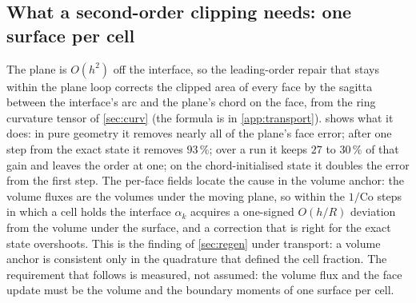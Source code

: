 \documentclass[preprint,12pt]{elsarticle}
\begin{document}
\subsection{What a second-order clipping needs: one surface per cell}
\label{sec:tpf-sagitta}

The plane is $O(h^2)$ off the interface, so the leading-order repair that stays within the plane loop corrects the clipped area of every face by the sagitta between the interface's arc and the plane's chord on the face, from the ring curvature tensor of \cref{sec:curv} (the formula is in \ref{app:transport}).  shows what it does: in pure geometry it removes nearly all of the plane's face error; after one step from the exact state it removes $93\,\%$; over a run it keeps $27$ to $30\,\%$ of that gain and leaves the order at one; on the chord-initialised state it doubles the error from the first step. The per-face fields locate the cause in the volume anchor: the volume fluxes are the volumes under the moving plane, so within the $1/\mathrm{Co}$ steps in which a cell holds the interface $\alpha_k$ acquires a one-signed $O(h/R)$ deviation from the volume under the surface, and a correction that is right for the exact state overshoots. This is the finding of \cref{sec:regen} under transport: a volume anchor is consistent only in the quadrature that defined the cell fraction. The requirement that follows is measured, not assumed: the volume flux and the face update must be the volume and the boundary moments of one surface per cell.
\end{document}
